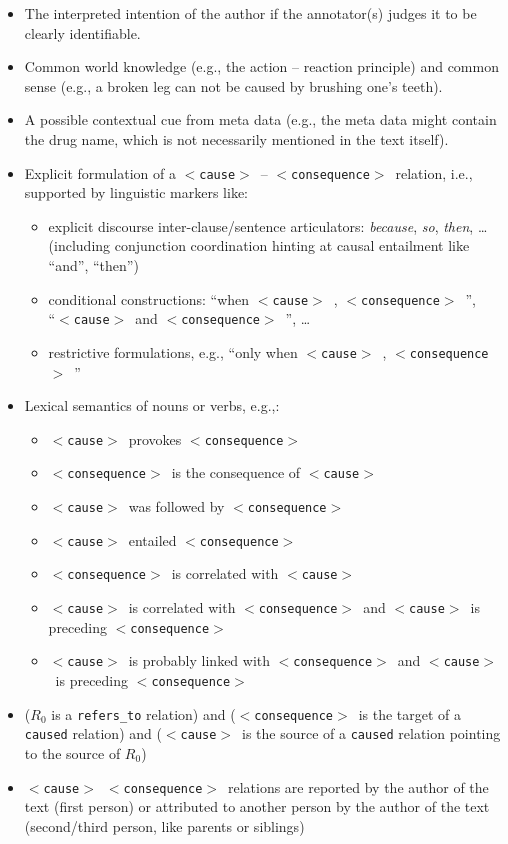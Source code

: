 \documentclass[12pt]{article}
\theoremstyle{definition}
\newcommand{\cause}{$<$\texttt{cause}$>$\ }
\newcommand{\conseq}{$<$\texttt{consequence}$>$\ }
\begin{document}
\begin{itemize}
    \item The interpreted intention of the author if the annotator(s) judges it to be clearly identifiable.
    \item Common world knowledge (e.g., the action -- reaction principle) and common sense (e.g., a broken leg can not be caused by brushing one's teeth).
    \item A possible contextual cue from meta data (e.g., the meta data might contain the drug name, which is not necessarily mentioned in the text itself).
    \item Explicit formulation of a \cause-- \conseq relation, i.e., supported by linguistic markers like:
    \begin{itemize}
        \item explicit discourse inter-clause/sentence articulators: \textit{because}, \textit{so}, \textit{then}, \ldots (including conjunction coordination hinting at  causal entailment like ``and'', ``then'') %
        \item conditional constructions: ``when \cause , \conseq'',  \\ ``\cause and \conseq'', \ldots
        \item restrictive formulations, e.g., ``only when \cause , \conseq''
    \end{itemize}
    \item Lexical semantics of nouns or verbs, e.g.,:
    \begin{itemize}
        \item \cause  provokes \conseq
        \item \conseq is the consequence of \cause
        \item \cause was followed by \conseq
        \item \cause entailed \conseq
        \item \conseq is correlated with \cause
        \item \cause is correlated with \conseq and \cause is preceding \conseq
        \item \cause is probably linked with \conseq and \cause is preceding \conseq
    \end{itemize}
    \item ($R_0$ is a \texttt{refers\_to} relation) and (\conseq is the target of a \texttt{caused} relation) and (\cause is the source of a \texttt{caused} relation pointing  to the source of $R_0$)
    \item \cause \conseq relations are reported by the author of the text (first person) or attributed to another person by the author of the text (second/third person, like parents or siblings)

\end{itemize}
\end{document}
